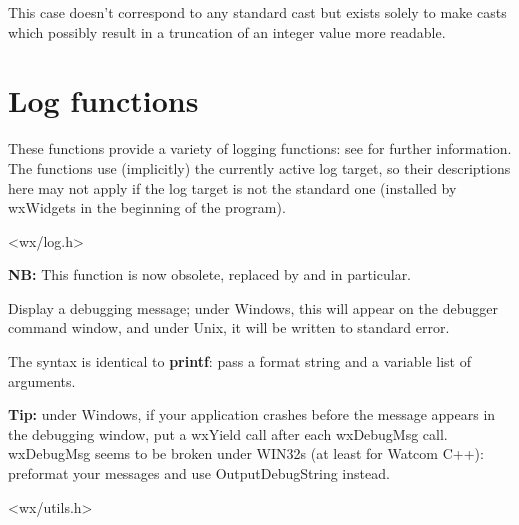 \label{wxtruncatecast}


This case doesn't correspond to any standard cast but exists solely to make
casts which possibly result in a truncation of an integer value more readable.




\section{Log functions}\label{logfunctions}

These functions provide a variety of logging functions: see  for
further information. The functions use (implicitly) the currently active log
target, so their descriptions here may not apply if the log target is not the
standard one (installed by wxWidgets in the beginning of the program).


<wx/log.h>


\label{wxdebugmsg}


{\bf NB:} This function is now obsolete, replaced by  and  in particular.

Display a debugging message; under Windows, this will appear on the
debugger command window, and under Unix, it will be written to standard
error.

The syntax is identical to {\bf printf}: pass a format string and a
variable list of arguments.

{\bf Tip:} under Windows, if your application crashes before the
message appears in the debugging window, put a wxYield call after
each wxDebugMsg call. wxDebugMsg seems to be broken under WIN32s
(at least for Watcom C++): preformat your messages and use OutputDebugString
instead.


<wx/utils.h>


\label{wxerror}


